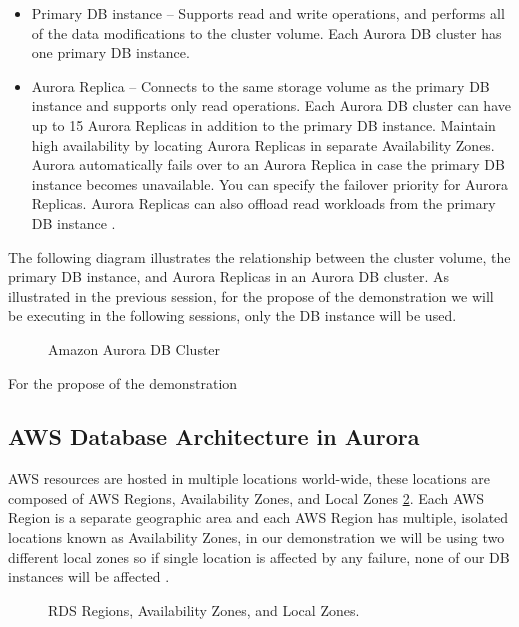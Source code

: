 \documentclass{article}
\begin{document}
\begin{itemize}
    \item Primary DB instance – Supports read and write operations, and performs all of the data modifications to the cluster volume. Each Aurora DB cluster has one primary DB instance.
    \item Aurora Replica – Connects to the same storage volume as the primary DB instance and supports only read operations. Each Aurora DB cluster can have up to 15 Aurora Replicas in addition to the primary DB instance. Maintain high availability by locating Aurora Replicas in separate Availability Zones. Aurora automatically fails over to an Aurora Replica in case the primary DB instance becomes unavailable. You can specify the failover priority for Aurora Replicas. Aurora Replicas can also offload read workloads from the primary DB instance \cite{dbcluster2021}.
\end{itemize}

The following diagram illustrates the relationship between the cluster volume, the primary DB instance, and Aurora Replicas in an Aurora DB cluster. As illustrated in the previous session, for the propose of the demonstration we will be executing in the following sessions, only the DB instance will be used. 

\begin{figure}[hbt!]
\centering
\caption{\label{fig:dbcluster} Amazon Aurora DB Cluster}
\end{figure}

For the propose of the demonstration 
\subsection{AWS Database Architecture in Aurora}

AWS resources are hosted in multiple locations world-wide, these locations are composed of AWS Regions, Availability Zones, and Local Zones \ref{fig:awszones}. Each AWS Region is a separate geographic area and each AWS Region has multiple, isolated locations known as Availability Zones, in our demonstration we will be using two different local zones so if single location is affected by any failure, none of our DB instances will be affected \cite{awszones}. 

\begin{figure}[hbt!]
\centering
\caption{\label{fig:awszones} RDS Regions, Availability Zones, and Local Zones.}
\end{figure}
\end{document}
